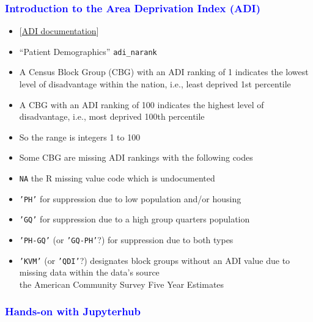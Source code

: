 \documentclass[11pt,pdftex,dvipsnames,usenames]{beamer}
\begin{document}
\begin{frame}[fragile]\frametitle{\bf\textcolor{blue}{Introduction to
the Area Deprivation Index (ADI)}}
\begin{itemize}
\item \textcolor{PineGreen}{[\href{https://www.neighborhoodatlas.medicine.wisc.edu}{ADI documentation}]}
\item ``Patient Demographics'' \texttt{adi\_narank}
\item A Census Block Group (CBG) with an ADI ranking of 1 indicates the lowest level of disadvantage within the nation, i.e., least deprived 1st percentile
\item A CBG with an ADI ranking of 100 indicates the highest level of disadvantage, i.e., most deprived 100th percentile
\item So the range is integers 1 to 100
\item Some CBG are missing ADI rankings with the following codes
\item \texttt{NA} the R missing value code which is undocumented
\item \texttt{'PH'} for suppression due to low population and/or housing 
\item \texttt{'GQ'} for suppression due to a high group quarters population
\item \texttt{'PH-GQ'}  (or \texttt{'GQ-PH'}?) 
for suppression due to both types
\item \texttt{'KVM'} (or \texttt{'QDI'}?) 
designates block groups without an ADI value due to 
  missing data within the data's source\\
the American Community Survey Five Year Estimates
\end{itemize}
\end{frame}

\begin{frame}[fragile]\frametitle{\bf\textcolor{blue}{Hands-on with Jupyterhub}}

\end{frame}
\end{document}
